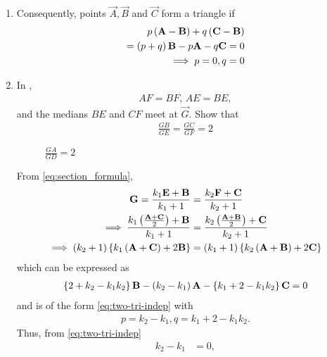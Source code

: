 \begin{enumerate}[label=\thesection.\arabic*.,ref=\thesection.\theenumi]
  \item Consequently, points $\vec{A},\vec{B}$ and $\vec{C}$ form a triangle  if 
	  \label{prop:two-tri-indep}
  \begin{align}
	  p\brak{\vec{A}- \vec{B}} +q\brak{\vec{C} -\vec{B}} 
	  \\
	  =\brak{p+q}\vec{B}- p\vec{A} -q\vec{C} = 0
	  \\
	  \implies p=0, q=0
	  \label{eq:two-tri-indep}
  \end{align}
  \item In 
	, 
	\begin{align}
	AF = BF, \,
	AE = BE, 
	\end{align}
	and the medians $BE$ and $CF$ meet at $\vec{G}$.
	Show that 
	\begin{align}
\label{eq:tri_med_centroid_ratio}
	\frac{GB}{GE} = \frac{GC}{GF} = 2
	\end{align}
%
\begin{figure}[!ht]
	\begin{center}
		\resizebox{\columnwidth}{!}{}
	\end{center}
	\caption{$\frac{GA}{GD} =2$}
	\label{fig:tri_med_meet}	
\end{figure}
\solution From 
	  \eqref{eq:section_formula},
  \begin{align}
	  \label{eq:section_formula-G}
\vec{G} = 
	   \frac{k_1\vec{E}+ \vec{B}}{k_1+1}
	  &= \frac{k_2\vec{F}+ \vec{C}}{k_2+1}
	  \\
	  \implies 
	   \frac{k_1\brak{\frac{\vec{A}+\vec{C}}{2}}+ \vec{B}}{k_1+1}
	  &= \frac{k_2\brak{\frac{\vec{A}+\vec{B}}{2}}+ \vec{C}}{k_2+1}
	  \\
	  \implies 
	\brak{k_2+1}   \cbrak{k_1\brak{{\vec{A}+\vec{C}}}+ 2\vec{B}}
	  &= \brak{k_1+1}\cbrak{k_2\brak{{\vec{A}+\vec{B}}}+ 2\vec{C}}
  \end{align}
  which can be expressed as
  \begin{align}
	  \left\{2 + k_2- k_1k_2 \right\}\mathbf{B}-\left(k_2-k_1\right)\mathbf{A}  - \left\{k_1 +2 - k_1k_2\right\}\mathbf{C}
	  =0
  \end{align}
  and is of the form
	  \eqref{eq:two-tri-indep}
	  with 
  \begin{align}
	  p = {k_2-k_1}, q = {k_1 +2 - k_1k_2}.
  \end{align}
  Thus, from 
	  \eqref{eq:two-tri-indep}
  \begin{align}
\label{eq:tri_med_centroid_ratio-1}
	  k_2-k_1 &= 0,
	  \\

\end{align}
\end{enumerate}
